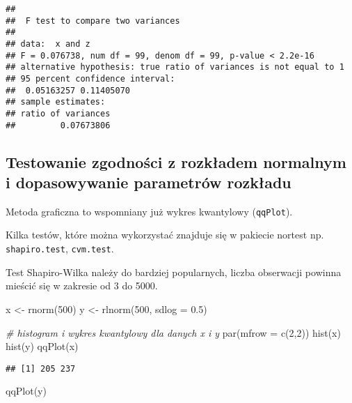 \documentclass[
]{book}
\newenvironment{Shaded}{\begin{snugshade}}{\end{snugshade}}
\newcommand{\AttributeTok}[1]{\textcolor[rgb]{0.77,0.63,0.00}{#1}}
\newcommand{\CommentTok}[1]{\textcolor[rgb]{0.56,0.35,0.01}{\textit{#1}}}
\newcommand{\DecValTok}[1]{\textcolor[rgb]{0.00,0.00,0.81}{#1}}
\newcommand{\FloatTok}[1]{\textcolor[rgb]{0.00,0.00,0.81}{#1}}
\newcommand{\FunctionTok}[1]{\textcolor[rgb]{0.00,0.00,0.00}{#1}}
\newcommand{\NormalTok}[1]{#1}
\newcommand{\OtherTok}[1]{\textcolor[rgb]{0.56,0.35,0.01}{#1}}
\begin{document}
\begin{verbatim}
## 
##  F test to compare two variances
## 
## data:  x and z
## F = 0.076738, num df = 99, denom df = 99, p-value < 2.2e-16
## alternative hypothesis: true ratio of variances is not equal to 1
## 95 percent confidence interval:
##  0.05163257 0.11405070
## sample estimates:
## ratio of variances 
##         0.07673806
\end{verbatim}

\hypertarget{testowanie-zgodnoux15bci-z-rozkux142adem-normalnym-i-dopasowywanie-parametruxf3w-rozkux142adu}{%
\subsection{Testowanie zgodności z rozkładem normalnym i dopasowywanie parametrów rozkładu}\label{testowanie-zgodnoux15bci-z-rozkux142adem-normalnym-i-dopasowywanie-parametruxf3w-rozkux142adu}}

Metoda graficzna to wspomniany już wykres kwantylowy (\texttt{qqPlot}).

Kilka testów, które można wykorzystać znajduje się w pakiecie nortest np. \texttt{shapiro.test}, \texttt{cvm.test}.

Test Shapiro-Wilka należy do bardziej popularnych, liczba obserwacji powinna mieścić się w zakresie od 3 do 5000.

\begin{Shaded}
\begin{Highlighting}[]
\NormalTok{x }\OtherTok{\textless{}{-}} \FunctionTok{rnorm}\NormalTok{(}\DecValTok{500}\NormalTok{)}
\NormalTok{y }\OtherTok{\textless{}{-}} \FunctionTok{rlnorm}\NormalTok{(}\DecValTok{500}\NormalTok{, }\AttributeTok{sdlog =} \FloatTok{0.5}\NormalTok{)}

\CommentTok{\# histogram i wykres kwantylowy dla danych x i y}
\FunctionTok{par}\NormalTok{(}\AttributeTok{mfrow =} \FunctionTok{c}\NormalTok{(}\DecValTok{2}\NormalTok{,}\DecValTok{2}\NormalTok{))}
\FunctionTok{hist}\NormalTok{(x)}
\FunctionTok{hist}\NormalTok{(y)}
\FunctionTok{qqPlot}\NormalTok{(x)}
\end{Highlighting}
\end{Shaded}

\begin{verbatim}
## [1] 205 237
\end{verbatim}

\begin{Shaded}
\begin{Highlighting}[]
\FunctionTok{qqPlot}\NormalTok{(y)}
\end{Highlighting}
\end{Shaded}
\end{document}
